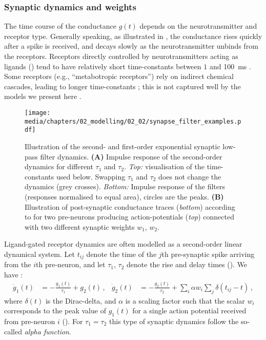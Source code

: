 \subsubsection{Synaptic dynamics and weights}
The time course of the conductance $g(t)$ depends on the neurotransmitter and receptor type.
Generally speaking, as illustrated in , the conductance rises quickly after a spike is received, and decays slowly as the neurotransmitter unbinds from the receptors.
Receptors directly controlled by neurotransmitters acting as ligands () tend to have relatively short time-constants between $1$ and \SI{100}{\milli\second} \citep{jones2014neurotransmitter}.
Some receptors (e.g., \enquote{metabotropic receptors}) rely on indirect chemical cascades, leading to longer time-constants \citep[Chapter~14]{meriney2019synaptic}; this is not captured well by the models we present here \citep{roth2009modeling}.

\begin{figure}
	\texttt{[image: media/chapters/02\_modelling/02\_02/synapse\_filter\_examples.pdf]}
	{\label{fig:synapse_filter_examples_time_constants}}%
	{\label{fig:synapse_filter_examples_traces}}%
	\caption[Second- and first-order exponential synaptic low-pass filter dynamics]{Illustration of the second- and first-order exponential synaptic low-pass filter dynamics. \textbf{(A)} Impulse response of the second-order dynamics for different $\tau_1$ and $\tau_2$. \emph{Top:} visualisation of the time-constants used below. Swapping $\tau_1$ and $\tau_2$ does not change the dynamics (grey crosses). \emph{Bottom:} Impulse response of the filters (responses normalised to equal area), circles are the peaks. \textbf{(B)} Illustration of post-synaptic conductance traces (\emph{bottom}) according to  for two pre-neurons producing action-potentials (\emph{top}) connected with two different synaptic weights $w_1$, $w_2$.}
\end{figure}

Ligand-gated receptor dynamics are often modelled as a second-order linear dynamical system.
Let $t_{ij}$ denote the time of the $j$th pre-synaptic spike arriving from the $i$th pre-neuron, and let $\tau_1$, $\tau_2$ denote the rise and delay times ().
We have \citep{roth2009modeling}:
\begin{align}
	\dot g_1(t) &= -\frac{g_1(t)}{\tau_\mathrm{1}} + g_2(t) \,, &
	\dot g_2(t) &= -\frac{g_2(t)}{\tau_\mathrm{2}} + \sum\nolimits_{i} \alpha w_i \sum\nolimits_{j} \delta(t_{ij} - t) \,,
	\label{eqn:low_pass_second_order}
\end{align}
where $\delta(t)$ is the Dirac-delta, and $\alpha$ is a scaling factor such that the scalar $w_i$ corresponds to the peak value of $g_1(t)$ for a single action potential received from pre-neuron $i$ ().
For $\tau_1 = \tau_2$ this type of synaptic dynamics follow the so-called \emph{alpha function}.

